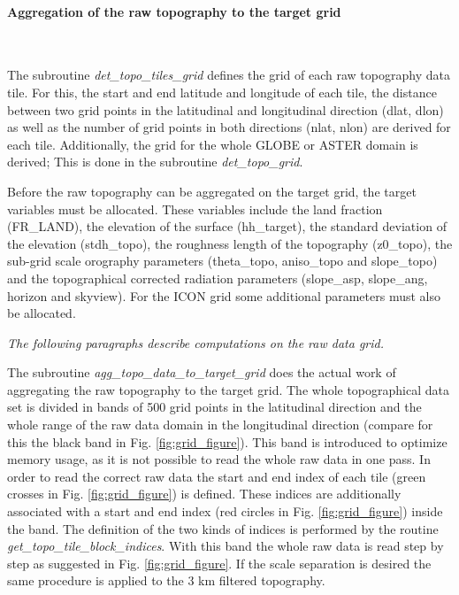 \documentclass[a4paper,10pt,DIV14,BCOR1cm,titlepage,twoside]{scrartcl}
\begin{document}
\paragraph{Aggregation of the raw topography to the target grid}\ \par\medskip\noindent
The subroutine \textit{det\_topo\_tiles\_grid} defines the grid of each raw topography data tile. For this, the start and end latitude and longitude of each tile, the distance between two grid points in the latitudinal and longitudinal direction (dlat, dlon) as well as the number of grid points in both directions (nlat, nlon) are derived for each tile. Additionally, the grid for the whole GLOBE or ASTER domain is derived; This is done in the subroutine \textit{det\_topo\_grid}.\par\medskip\noindent
Before the raw topography can be aggregated on the target grid, the target variables must be allocated. These variables include the land fraction (FR\_LAND), the elevation of the surface (hh\_target), the standard deviation of the elevation (stdh\_topo), the roughness length of the topography (z0\_topo), the sub-grid scale orography parameters (theta\_topo, aniso\_topo and slope\_topo) and the topographical corrected radiation parameters (slope\_asp, slope\_ang, horizon and skyview). For the ICON grid some additional parameters must also be allocated.\par\medskip\noindent
\textit{The following paragraphs describe computations on the raw data grid.}\par\medskip\noindent
The subroutine \textit{agg\_topo\_data\_to\_target\_grid} does the actual work of aggregating the raw topography to the target grid. The whole topographical data set is divided in bands of 500 grid points in the latitudinal direction and the whole range of the raw data domain in the longitudinal direction (compare for this the black band in Fig. \ref{fig:grid_figure}). This band is introduced to optimize memory usage, as it is not possible to read the whole raw data in one pass. In order to read the correct raw data the start and end index of each tile (green crosses in Fig. \ref{fig:grid_figure}) is defined. These indices are additionally associated with a start and end index (red circles in Fig. \ref{fig:grid_figure}) inside the band. The definition of the two kinds of indices is performed by the routine \textit{get\_topo\_tile\_block\_indices}. With this band the whole raw data is read step by step as suggested in Fig. \ref{fig:grid_figure}. If the scale separation is desired the same procedure is applied to the 3 km filtered topography.\par\medskip\noindent
\end{document}
